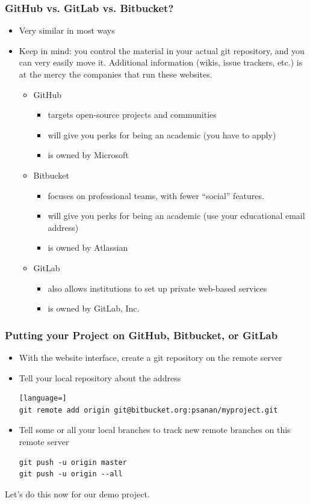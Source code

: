 \begin{frame}[fragile]
\frametitle{GitHub vs. GitLab vs. Bitbucket?}
\begin{itemize}
\item Very similar in most ways
\item Keep in mind: you control the material in your actual git repository, and you can very easily move it. Additional information (wikis, issue trackers, etc.) is at the mercy the companies that run these websites.
\begin{itemize}
\item
GitHub
\begin{itemize}
\item targets open-source projects and communities
\item will give you perks for being an academic (you have to apply)
\item is owned by Microsoft
\end{itemize}
\item Bitbucket
\begin{itemize}
\item focuses on professional teams, with fewer ``social'' features.
\item will give you perks for being an academic (use  your educational email address)
\item is owned by Atlassian
\end{itemize}
\item GitLab
\begin{itemize}
\item also allows institutions to set up private web-based services
\item is owned by GitLab, Inc.
\end{itemize}
\end{itemize}
\end{itemize}
\end{frame}

\begin{frame}[fragile]
\frametitle{Putting your Project on GitHub, Bitbucket, or GitLab}
\begin{itemize}
\item With the website interface, create a git repository on the remote server
\item Tell your local repository about the address
\begin{lstlisting}[language=]
git remote add origin git@bitbucket.org:psanan/myproject.git
\end{lstlisting}
\item Tell some or all your local branches to track new remote branches on this remote server
\begin{lstlisting}
git push -u origin master
git push -u origin --all
\end{lstlisting}
\end{itemize}

Let's do this now for our demo project.

\end{frame}


